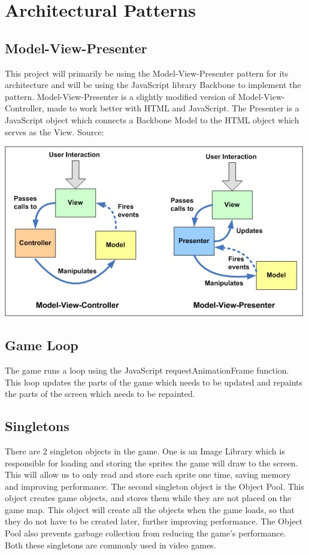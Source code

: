 \section{Architectural Patterns}

\subsection*{Model-View-Presenter}
This project will primarily be using the Model-View-Presenter pattern for its architecture and will 
be using the JavaScript library Backbone to implement the pattern. Model-View-Presenter is a slightly
modified version of Model-View-Controller, made to work better with HTML and JavaScript. The Presenter
is a JavaScript object which connects a Backbone Model to the HTML object which serves as the View.
Source: \cite{mvp}

\includegraphics{pictures/mvc_mvp}

\subsection*{Game Loop}
The game runs a loop using the JavaScript requestAnimationFrame function. This loop updates the parts 
of the game which needs to be updated and repaints the parts of the screen which needs to be repainted.

\subsection*{Singletons}
There are 2 singleton objects in the game. One is an Image Library which is responsible for loading 
and storing the sprites the game will draw to the screen. This will allow us to only read and store 
each sprite one time, saving memory and improving performance. The second singleton object is the 
Object Pool. This object creates game objects, and stores them while they are not placed on the game 
map. This object will create all the objects when the game loads, so that they do not have to be 
created later, further improving performance. The Object Pool also prevents garbage collection from 
reducing the game's performance. Both these singletons are commonly used in video games.
